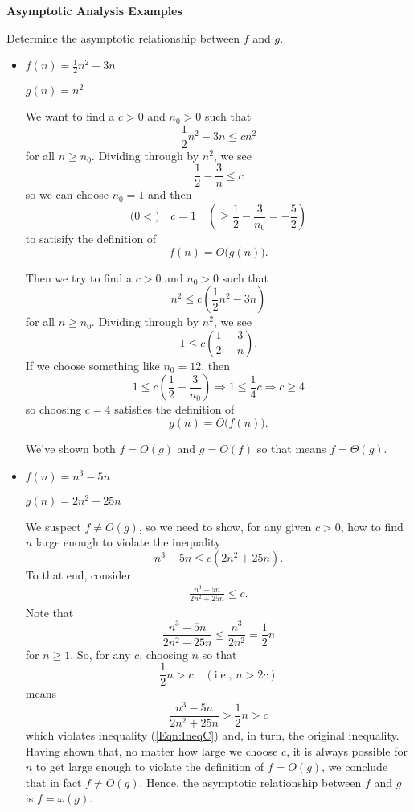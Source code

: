 \documentclass{article}
\begin{document}
{\Large\bf Asymptotic Analysis Examples}

\vspace{1pc}
Determine the asymptotic relationship between $f$ and $g$.

\begin{itemize}
\item
$f(n) = \frac{1}{2}n^2 - 3n$

$g(n) = n^2$

We want to find a $c>0$ and $n_0>0$ such that
\[
  \frac{1}{2}n^2 - 3n \le cn^2
\]
for all $n\ge n_0$.
Dividing through by $n^2$, we see
\[
  \frac{1}{2} - \frac{3}{n} \le c
\]
so we can choose $n_0=1$ and then
\[
  \Big(
  0 <
  \Big)
  \quad
  c = 1
  \quad
  \left(
  \ge
  \frac{1}{2} - \frac{3}{n_0}
  = -\frac{5}{2}
  \right)
\]
to satisify the definition of
\[
  f(n) = O\big(g(n)\big).
\]

Then we try to find a
$c>0$ and $n_0>0$ such that
\[
  n^2 \le c\left(\frac{1}{2}n^2 - 3n\right)
\]
for all $n\ge n_0$.
Dividing through by $n^2$, we see
\[
  1 \le c\left(\frac{1}{2} - \frac{3}{n}\right).
\]
If we choose something like $n_0=12$, then
\[
  1 \le c\left(\frac{1}{2} - \frac{3}{n_0}\right)
\Longrightarrow
  1 \le \frac{1}{4}c
\Longrightarrow
  c \ge 4
\]
so choosing $c=4$ satisfies the definition of
\[
  g(n) = O\big(f(n)\big).
\]

We've shown both
$f=O(g)$
and
$g=O(f)$
so that means
$f=\Theta(g)$.

\vspace{1pc}
\item
$f(n) = n^3 - 5n$

$g(n) = 2n^2 + 25n$

We suspect $f\ne O(g)$, so we need to show, for any given $c>0$, how to find $n$ large enough to violate the inequality
\[
   n^3 - 5n \le c\left(2n^2 + 25n\right).
\]
To that end, consider
\begin{eqnarray}
\label{Eqn:IneqC}
   \frac{n^3 - 5n}{2n^2 + 25n} \le c.
\end{eqnarray}
Note that
\[
   \frac{n^3 - 5n}{2n^2 + 25n} \le \frac{n^3}{2n^2} = \frac{1}{2}n
\]
for $n\ge1$.
So, for any $c$, choosing $n$ so that
\[
  \frac{1}{2}n > c \quad (\mbox{i.e., }n>2c)
\]
means
\[
  \frac{n^3 - 5n}{2n^2 + 25n} > \frac{1}{2}n > c
\]
which violates inequality (\ref{Eqn:IneqC}) and, in turn,
the original inequality.
Having shown that, no matter how large we choose $c$, it is always
possible for $n$ to get large enough to violate the definition
of $f=O(g)$, we conclude that in fact $f\ne O(g)$.
Hence, the asymptotic relationship between $f$ and $g$ is
$f=\omega(g)$.


\end{itemize}
\end{document}

